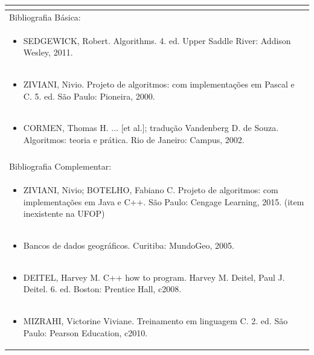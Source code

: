 \documentclass[11pt]{article}
\begin{document}
\begin{center}
\begin{longtable}{|p{4cm}|p{4cm}|p{4cm}|p{4cm}|}
\multicolumn{4}{|p{\dimexpr 16cm + 6\tabcolsep\relax}|}{}\\
\hline
\multicolumn{4}{|p{16cm}|}{Bibliografia Básica:}\\*
\multicolumn{4}{|p{\dimexpr 16cm + 6\tabcolsep\relax}|}{\begin{itemize}\item SEDGEWICK, Robert. Algorithms. 4. ed. Upper Saddle River: Addison Wesley, 2011.\end{itemize}}\\
\multicolumn{4}{|p{\dimexpr 16cm + 6\tabcolsep\relax}|}{\begin{itemize}\item ZIVIANI, Nivio. Projeto de algoritmos: com implementações em Pascal e C. 5. ed. São Paulo: Pioneira, 2000.\end{itemize}}\\
\multicolumn{4}{|p{\dimexpr 16cm + 6\tabcolsep\relax}|}{\begin{itemize}\item CORMEN, Thomas H. ... [et al.]; tradução Vandenberg D. de Souza. Algoritmos: teoria e prática. Rio de Janeiro: Campus, 2002.\end{itemize}}\\
\multicolumn{4}{|p{16cm}|}{}\\
\hline
\multicolumn{4}{|p{16cm}|}{Bibliografia Complementar:}\\*
\multicolumn{4}{|p{\dimexpr 16cm + 6\tabcolsep\relax}|}{\begin{itemize}\item ZIVIANI, Nivio; BOTELHO, Fabiano C. Projeto de algoritmos: com implementações em Java e C++. São Paulo: Cengage Learning, 2015. (item inexistente na UFOP)\end{itemize}}\\
\multicolumn{4}{|p{\dimexpr 16cm + 6\tabcolsep\relax}|}{\begin{itemize}\item Bancos de dados geográficos. Curitiba: MundoGeo, 2005.\end{itemize}}\\
\multicolumn{4}{|p{\dimexpr 16cm + 6\tabcolsep\relax}|}{\begin{itemize}\item DEITEL, Harvey M. C++ how to program. Harvey M. Deitel, Paul J. Deitel. 6. ed. Boston: Prentice Hall, c2008.\end{itemize}}\\
\multicolumn{4}{|p{\dimexpr 16cm + 6\tabcolsep\relax}|}{\begin{itemize}\item MIZRAHI, Victorine Viviane. Treinamento em linguagem C. 2. ed. São Paulo: Pearson Education, c2010.\end{itemize}}\\

\end{longtable}
\end{center}
\end{document}
